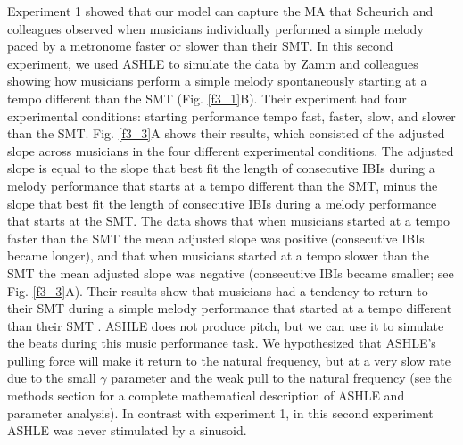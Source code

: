 \documentclass{report}
\begin{document}
Experiment 1 showed that our model can capture the MA that Scheurich and colleagues \cite{scheurich2018tapping} observed when musicians individually performed a simple melody paced by a metronome faster or slower than their SMT. In this second experiment, we used ASHLE to simulate the data by Zamm and colleagues \cite{zamm2018musicians} showing how musicians perform a simple melody spontaneously starting at a tempo different than the SMT (Fig.{} \ref{f3_1}B). Their experiment had four experimental conditions: starting performance tempo fast, faster, slow, and slower than the SMT. Fig.{} \ref{f3_3}A shows their results, which consisted of the adjusted slope across musicians in the four different experimental conditions. The adjusted slope is equal to the slope that best fit the length of consecutive IBIs during a melody performance that starts at a tempo different than the SMT, minus the slope that best fit the length of consecutive IBIs during a melody performance that starts at the SMT. The data shows that when musicians started at a tempo faster than the SMT the mean adjusted slope was positive (consecutive IBIs became longer), and that when musicians started at a tempo slower than the SMT the mean adjusted slope was negative (consecutive IBIs became smaller; see Fig.{} \ref{f3_3}A). Their results show that musicians had a tendency to return to their SMT during a simple melody performance that started at a tempo different than their SMT \cite{zamm2018musicians}. ASHLE does not produce pitch, but we can use it to simulate the beats during this music performance task. We hypothesized that ASHLE's pulling force will make it return to the natural frequency, but at a very slow rate due to the small $\gamma$ parameter and the weak pull to the natural frequency (see the methods section for a complete mathematical description of ASHLE and parameter analysis). In contrast with experiment 1, in this second experiment ASHLE was never stimulated by a sinusoid. 
\end{document}
